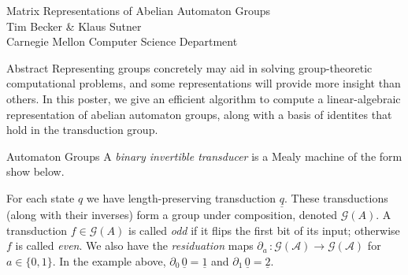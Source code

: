 \documentclass[a0]{a0poster}
\theoremstyle{pleasant}
\newcommand{\paren}[1]{\left(#1\right)}
\newcommand{\A}{\mathcal A}
\newcommand{\gp}[1]{\mathcal G\paren{#1}}
\newcommand{\aut}[1]{\underline{#1}}
\renewcommand{\d}[1]{\partial_{#1}\,}
\begin{document}
\begin{poster-header}
    \begin{center}
        \veryHuge
    {Matrix Representations of Abelian Automaton Groups}\\
    \huge {Tim Becker \& Klaus Sutner}\\
    \huge Carnegie Mellon Computer Science Department\\
    \end{center}
\end{poster-header}

\begin{multicols}{3}

\begin{poster-section}{Abstract}
    \large
    Representing groups concretely may aid in solving group-theoretic
    computational problems, and some representations will provide more insight
    than others. In this poster, we give an efficient algorithm to compute
    a linear-algebraic representation of abelian automaton groups, along with
    a basis of identites that hold in the transduction group.
\end{poster-section}

\begin{poster-section}{Automaton Groups}
\Large
A \emph{binary invertible transducer} is a Mealy machine of the form
show below.
\begin{center}
\end{center}
For each state $q$ we have length-preserving transduction $\aut{q}$.
These transductions (along with their inverses) form a group
under composition, denoted $\gp{A}$. A transduction $f \in \gp{A}$ is called
\emph{odd} if it flips the first bit of its input; otherwise $f$ is called
\emph{even}. We also have the \emph{residuation} maps $\d{a} :
\gp{\A} \rightarrow \gp{\A}$ for $a \in \{0,1\}$.
In the example above, $\d{0} \aut{0} = \aut{1}$ and
$\d{1} \aut{0} = \aut{2}$.\\


\end{poster-section}
\end{multicols}
\end{document}
